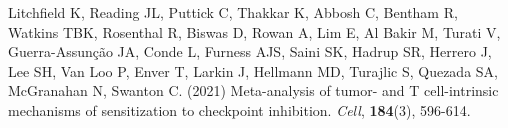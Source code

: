 \documentclass[12pt]{article}
\begin{document}
\begin{thebibliography}{75}
 Litchfield K, Reading JL, Puttick C, Thakkar K, Abbosh C, Bentham R, Watkins TBK, Rosenthal R, Biswas D, Rowan A, Lim E, Al Bakir M, Turati V, Guerra-Assunção JA, Conde L, Furness AJS, Saini SK, Hadrup SR, Herrero J, Lee SH, Van Loo P, Enver T, Larkin J, Hellmann MD, Turajlic S, Quezada SA, McGranahan N, Swanton C. (2021) Meta-analysis of tumor- and T cell-intrinsic mechanisms of sensitization to checkpoint inhibition. \emph{Cell}, \textbf{184}(3), 596-614. 

\end{thebibliography}

\clearpage
\end{document}
